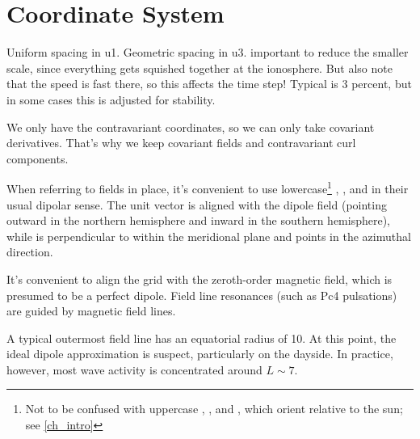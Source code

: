 \section{Coordinate System}
  \label{sec_coords}



Uniform spacing in u1. Geometric spacing in u3. important to reduce the smaller scale, since everything gets squished together at the ionosphere. But also note that the \Alfven speed is fast there, so this affects the time step! Typical is 3 percent, but in some cases this is adjusted for stability. 

We only have the contravariant coordinates, so we can only take covariant derivatives. That's why we keep covariant fields and contravariant curl components. 

When referring to fields in place, it's convenient to use lowercase\footnote{ Not to be confused with uppercase \X, \Y, and \Z, which orient relative to the sun; see \cref{ch_intro} } \x, \y, and \z in their usual dipolar sense. The unit vector \zhat is aligned with the dipole field (pointing outward in the northern hemisphere and inward in the southern hemisphere), while \xhat is perpendicular to \zhat within the meridional plane and \yhat points in the azimuthal direction. 



It's convenient to align the grid with the zeroth-order magnetic field, which is presumed to be a perfect dipole. Field line resonances (such as Pc4 pulsations) are guided by magnetic field lines. 


A typical outermost field line has an equatorial radius of \SI{10}{\RE}. At this point, the ideal dipole approximation is suspect, particularly on the dayside. In practice, however, most wave activity is concentrated around $L \sim \num{7}$. 

